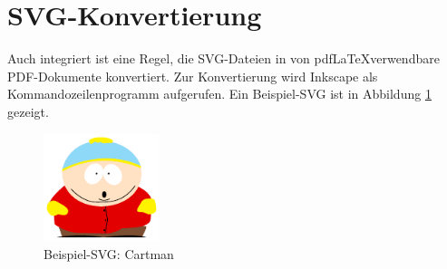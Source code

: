 \section{SVG-Konvertierung}

Auch integriert ist eine Regel, die SVG-Dateien in von pdf\LaTeX verwendbare PDF-Dokumente konvertiert. Zur Konvertierung wird Inkscape\cite{inkscape} als Kommandozeilenprogramm aufgerufen.
Ein Beispiel-SVG ist in Abbildung \ref{fig:cartman} gezeigt.

\begin{figure}[!ht]
    \centering
    \caption{Beispiel-SVG: Cartman}
    \label{fig:cartman}
    \includegraphics[width=0.3\textwidth]{img/cartman}
\end{figure}
